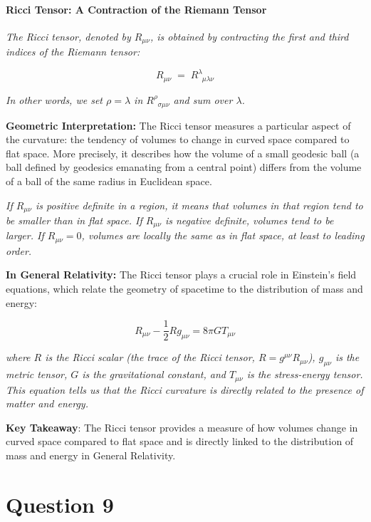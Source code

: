 \paragraph{Ricci Tensor: A Contraction of the Riemann Tensor}

\textit{The Ricci tensor, denoted by \(R_{\mu\nu}\), is obtained by contracting the first and third indices of the Riemann tensor:}

\[
R_{\mu\nu} \;=\; R^\lambda_{\;\;\mu\lambda\nu}
\]

\textit{In other words, we set \(\rho = \lambda\) in \(R^\rho_{\;\;\sigma\mu\nu}\) and sum over \(\lambda\).}

\textbf{Geometric Interpretation:} The Ricci tensor measures a particular aspect of the curvature: the tendency of volumes to change in curved space compared to flat space. More precisely, it describes how the volume of a small geodesic ball (a ball defined by geodesics emanating from a central point) differs from the volume of a ball of the same radius in Euclidean space.

\textit{If \(R_{\mu\nu}\) is positive definite in a region, it means that volumes in that region tend to be smaller than in flat space. If \(R_{\mu\nu}\) is negative definite, volumes tend to be larger. If \(R_{\mu\nu} = 0\), volumes are locally the same as in flat space, at least to leading order.}

\textbf{In General Relativity:} The Ricci tensor plays a crucial role in Einstein's field equations, which relate the geometry of spacetime to the distribution of mass and energy:

\[
R_{\mu\nu} - \frac{1}{2} R g_{\mu\nu} = 8\pi G T_{\mu\nu}
\]

\textit{where \(R\) is the Ricci scalar (the trace of the Ricci tensor, \(R = g^{\mu\nu}R_{\mu\nu}\)), \(g_{\mu\nu}\) is the metric tensor, \(G\) is the gravitational constant, and \(T_{\mu\nu}\) is the stress-energy tensor. This equation tells us that the Ricci curvature is directly related to the presence of matter and energy.}

\textbf{Key Takeaway}: The Ricci tensor provides a measure of how volumes change in curved space compared to flat space and is directly linked to the distribution of mass and energy in General Relativity.

\pagebreak


\section*{Question 9}

